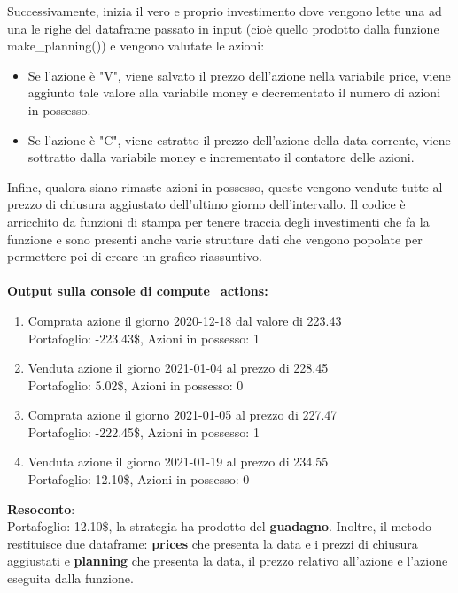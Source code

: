 \documentclass{article}
\begin{document}
Successivamente, inizia il vero e proprio investimento dove vengono lette una ad una le righe del dataframe passato in input (cioè quello prodotto dalla funzione make\_planning()) e vengono valutate le azioni:
\begin{itemize}
    \item Se l'azione è "V", viene salvato il prezzo dell'azione nella variabile price, viene aggiunto tale valore alla variabile money e decrementato il numero di azioni in possesso.
    \item Se l'azione è "C", viene estratto il prezzo dell'azione della data corrente, viene sottratto dalla variabile money e incrementato il contatore delle azioni.
\end{itemize}
Infine, qualora siano rimaste azioni in possesso, queste vengono vendute tutte al prezzo di chiusura aggiustato dell'ultimo giorno dell'intervallo. Il codice è arricchito da funzioni di stampa per tenere traccia degli investimenti che fa la funzione e sono presenti anche varie strutture dati che vengono popolate per permettere poi di creare un grafico riassuntivo.\\\\
\textbf{Output sulla console di compute\_actions:}
\begin{enumerate} 
    \item Comprata azione il giorno 2020-12-18 dal valore di 223.43\\
Portafoglio: -223.43\$, Azioni in possesso: 1

\item Venduta azione il giorno 2021-01-04 al prezzo di 228.45 \\
Portafoglio: 5.02\$, Azioni in possesso: 0

\item Comprata azione il giorno 2021-01-05 al prezzo di 227.47 \\
Portafoglio: -222.45\$, Azioni in possesso: 1

\item Venduta azione il giorno 2021-01-19 al prezzo di 234.55 \\
Portafoglio: 12.10\$, Azioni in possesso: 0
\end{enumerate}
\textbf{Resoconto}: \\
Portafoglio: 12.10\$, la strategia ha prodotto del \textbf{guadagno}.
\newpage
Inoltre, il metodo restituisce due dataframe: \textbf{prices} che presenta la data e i prezzi di chiusura aggiustati e \textbf{planning} che presenta la data, il prezzo relativo all'azione e l'azione eseguita dalla funzione. 
\end{document}
